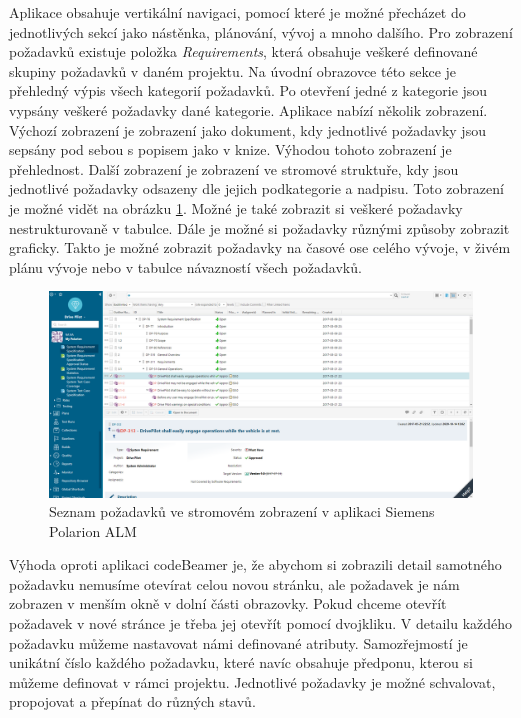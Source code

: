 \documentclass[czech,master]{diploma}
\begin{document}
Aplikace obsahuje vertikální navigaci, pomocí které je možné přecházet do jednotlivých sekcí jako nástěnka, plánování, vývoj a mnoho dalšího. Pro zobrazení požadavků existuje položka \textit{Requirements}, která obsahuje veškeré definované skupiny požadavků v daném projektu. Na úvodní obrazovce této sekce je přehledný výpis všech kategorií požadavků. Po otevření jedné z kategorie jsou vypsány veškeré požadavky dané kategorie. Aplikace nabízí několik zobrazení. Výchozí zobrazení je zobrazení jako dokument, kdy jednotlivé požadavky jsou sepsány pod sebou s popisem jako v knize. Výhodou tohoto zobrazení je přehlednost. Další zobrazení je zobrazení ve stromové struktuře, kdy jsou jednotlivé požadavky odsazeny dle jejich podkategorie a nadpisu. Toto zobrazení je možné vidět na obrázku \ref{fig:polarion_requirements}. Možné je také zobrazit si veškeré požadavky nestrukturovaně v tabulce. Dále je možné si požadavky různými způsoby zobrazit graficky. Takto je možné zobrazit požadavky na časové ose celého vývoje, v živém plánu vývoje nebo v tabulce návazností všech požadavků.

\begin{figure}[!ht]
    \centering
    \includegraphics[width=1\textwidth]{Diplomka/Figures/polarion_requirements.png}
    \caption{Seznam požadavků ve stromovém zobrazení v aplikaci Siemens Polarion ALM}
    \label{fig:polarion_requirements}
\end{figure}

Výhoda oproti aplikaci codeBeamer je, že abychom si zobrazili detail samotného požadavku nemusíme otevírat celou novou stránku, ale požadavek je nám zobrazen v menším okně v dolní části obrazovky. Pokud chceme otevřít požadavek v nové stránce je třeba jej otevřít pomocí dvojkliku. V detailu každého požadavku můžeme nastavovat námi definované atributy. Samozřejmostí je unikátní číslo každého požadavku, které navíc obsahuje předponu, kterou si můžeme definovat v rámci projektu. Jednotlivé požadavky je možné schvalovat, propojovat a přepínat do různých stavů.
\end{document}
